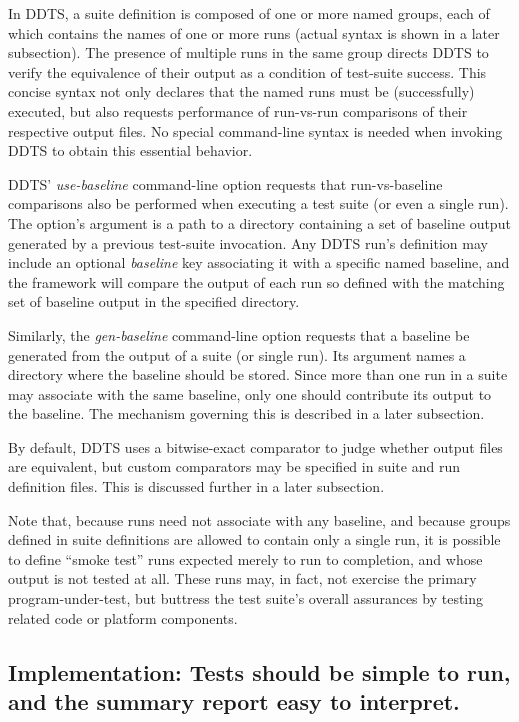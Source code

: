\documentclass[conference]{IEEEtran}
\begin{document}
In DDTS, a suite definition is composed of one or more named groups, each of which contains the names of one or more runs (actual syntax is shown in a later subsection). The presence of multiple runs in the same group directs DDTS to verify the equivalence of their output as a condition of test-suite success. This concise syntax not only declares that the named runs must be (successfully) executed, but also requests performance of run-vs-run comparisons of their respective output files. No special command-line syntax is needed when invoking DDTS to obtain this essential behavior.

DDTS' \emph{use-baseline} command-line option requests that run-vs-baseline comparisons also be performed when executing a test suite (or even a single run). The option's argument is a path to a directory containing a set of baseline output generated by a previous test-suite invocation. Any DDTS run's definition may include an optional \emph{baseline} key associating it with a specific named baseline, and the framework will compare the output of each run so defined with the matching set of baseline output in the specified directory.

Similarly, the \emph{gen-baseline} command-line option requests that a baseline be generated from the output of a suite (or single run). Its argument names a directory where the baseline should be stored. Since more than one run in a suite may associate with the same baseline, only one should contribute its output to the baseline. The mechanism governing this is described in a later subsection.

By default, DDTS uses a bitwise-exact comparator to judge whether output files are equivalent, but custom comparators may be specified in suite and run definition files. This is discussed further in a later subsection.

Note that, because runs need not associate with any baseline, and because groups defined in suite definitions are allowed to contain only a single run, it is possible to define ``smoke test'' runs expected merely to run to completion, and whose output is not tested at all. These runs may, in fact, not exercise the primary program-under-test, but buttress the test suite's overall assurances by testing related code or platform components.

\subsection{Implementation: Tests should be simple to run, and the summary report easy to interpret.}
\end{document}
